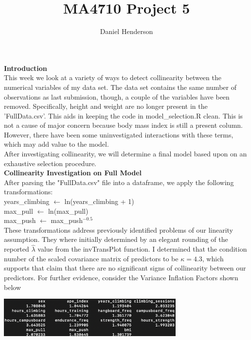 \documentclass[11pt]{amsart}
\title{MA4710 Project 5}
\author{Daniel Henderson}
\newcommand{\tab}{\hspace*{.75cm}}
\newcommand{\setTo}{\leftarrow}
\begin{document}
\maketitle

{\bf\large Introduction}\\
This week we look at a variety of ways to detect collinearity between the numerical variables of my data set. The data set contains the same number of observations as last submission, though, a couple of the variables have been removed.
Specifically, height and weight are no longer present in the 'FullData.csv'.
This aids in keeping the code in model\_selection.R clean.
This is not a cause of major concern because body mass index is still a present column. 
However, there have been some uninvestigated interactions with these terms, which may add value to the model.\\

After investigating collinearity, we will determine a final model based upon on an exhaustive selection procedure.\\

\vspace{0.25in}
{\bf\large Collinearity Investigation on Full Model}\\
After parsing the "FullData.csv" file into a dataframe, we apply the following transformations:\\

\tab years\_climbing $\setTo$ ln(years\_climbing + 1)\\
\tab max\_pull $\setTo$ ln(max\_pull)\\
\tab max\_push $\setTo$ max\_push$^{-0.5}$ \\

These transformations address previously identified problems of our linearity assumption.
They where initially determined by an elegant rounding of the reported $\hat\lambda$ value from the invTransPlot function.
I determined that the condition number of the scaled covariance matrix of predictors to be $\kappa = 4.3$, which supports that claim that there are no significant signs of collinearity between our predictors.
For further evidence, consider the Variance Inflation Factors shown below\\

\begin{center}
\includegraphics[width=0.7\textwidth]{vif}
\end{center}
\end{document}
